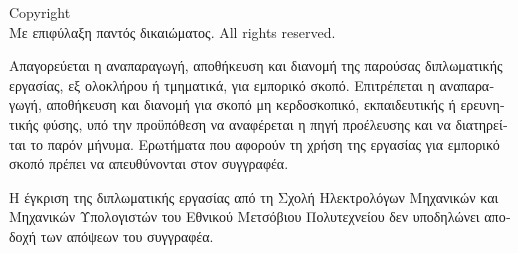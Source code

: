 \begin{otherlanguage}{greek}
\thispagestyle{empty}
\null
\vspace*{0.18\textheight}

\begin{center}
{\Large \myAuthor\par}
{\Large \myDegreeTitle\par}
\end{center}
\vspace{1.5\baselineskip}
\vfill
\noindent Copyright \textcopyright\  \myAuthor\, \myCopyrightYear\
\\Με επιφύλαξη παντός δικαιώματος. All rights reserved. 
\par\vspace{\baselineskip}

\noindent Απαγορεύεται η αναπαραγωγή,
αποθήκευση και διανομή της παρούσας διπλωματικής εργασίας, εξ ολοκλήρου ή
τμηματικά, για εμπορικό σκοπό. Επιτρέπεται η αναπαραγωγή, αποθήκευση και
διανομή για σκοπό μη κερδοσκοπικό, εκπαιδευτικής ή ερευνητικής φύσης, υπό την
προϋπόθεση να αναφέρεται η πηγή προέλευσης και να διατηρείται το παρόν
μήνυμα. Ερωτήματα που αφορούν τη χρήση της εργασίας για εμπορικό σκοπό πρέπει
να απευθύνονται στον συγγραφέα.
\par\vspace{\baselineskip}

\noindent Η έγκριση της διπλωματικής εργασίας από τη Σχολή Ηλεκτρολόγων
Μηχανικών και Μηχανικών Υπολογιστών του Εθνικού Μετσόβιου Πολυτεχνείου δεν
υποδηλώνει αποδοχή των απόψεων του συγγραφέα.
\end{otherlanguage}
